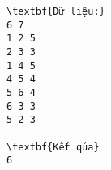 \begin{verbatim}
\textbf{Dữ liệu:}
6 7
1 2 5
2 3 3
1 4 5
4 5 4
5 6 4
6 3 3
5 2 3

\textbf{Kết qủa}
6
\end{verbatim}